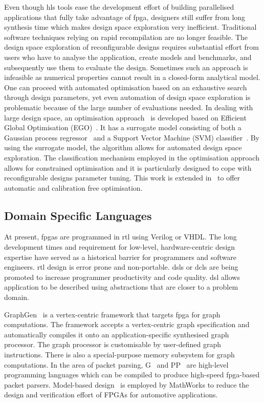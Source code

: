 Even though \gls{hls} tools ease the development effort of building parallelised applications that fully take advantage of \gls{fpga},
designers still suffer from long synthesis time which makes design space exploration very inefficient.
Traditional software techniques relying on rapid recompilation are no longer feasible.
The design space exploration of reconfigurable designs requires substantial effort from users who have to analyse the application, create models and benchmarks, and subsequently use them to evaluate the design.
Sometimes such an approach is infeasible as numerical properties cannot result in a closed-form analytical model.
One can proceed with automated optimisation based on an exhaustive search through design parameters, yet even automation of design space exploration is problematic because of the large number of evaluations needed.
In dealing with large design space, an optimisation approach~\cite{kurek13arc} is developed based on Efficient Global Optimisation (EGO)~\cite{jones98}.
It has a surrogate model consisting of both a Gaussian process regressor~\cite{rasmussen06} and a Support Vector Machine (SVM) classifier~\cite{kurek13arc,basudhar12}.
By using the surrogate model, the algorithm allows for automated design space exploration.
The classification mechanism employed in the optimisation approach allows for constrained optimisation and it is particularly designed to cope with reconfigurable designs parameter tuning. 
This work is extended in~\cite{kurek14fccm} to offer automatic and calibration free optimisation.

\subsection{Domain Specific Languages}
At present, \glspl{fpga} are programmed in \gls{rtl} using Verilog or VHDL. 
The long development times and requirement for low-level, hardware-centric design expertise have served as a historical barrier for programmers and software engineers. 
\gls{rtl} design is error prone and non-portable.
\glspl{dsl} or \glspl{dcl} are being promoted to increase programmer productivity and code quality.
\gls{dsl} allows application to be described using abstractions that are closer to a problem domain. 

GraphGen~\cite{nurvitadhi14} is a vertex-centric framework that targets \gls{fpga} for graph computations.
The framework accepts a vertex-centric graph specification and automatically compiles it onto an application-specific synthesised graph processor.
The graph processor is customisable by user-defined graph instructions.
There is also a special-purpose memory subsystem for graph computations.
In the area of packet parsing, G~\cite{brebner09} and PP~\cite{attig11} are high-level programming languages which can be compiled to produce high-speed \gls{fpga}-based packet parsers.
Model-based design~\cite{sharma09} is employed by MathWorks to reduce the design and verification effort of FPGAs for automotive applications.

